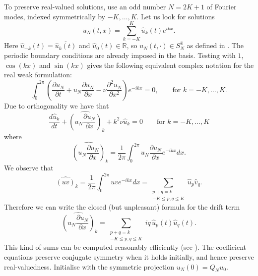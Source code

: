 To preserve real-valued solutions, use an odd number $N=2K+1$ of Fourier modes, indexed symmetrically by $-K,\dots,K$. Let us look for solutions
\begin{equation}
    \label{eq:Fourier discrete solution}
    u_N(t,x) = \sum_{k=-K}^{K} \hat u_k(t) e^{ikx}.
\end{equation}
Here $\hat u_{-k}(t)=\overline{\hat u_k(t)}$ and $\hat u_0(t)\in\mathbb R$, so $u_N(t,\cdot)\in S_N^{\mathbb R}$ as defined in . The periodic boundary conditions are already imposed in the basis. Testing with $1$, $\cos(kx)$ and $\sin(kx)$ gives the following equivalent complex notation for the real weak formulation:
\begin{equation*}
    \int_0^{2\pi} \left( \frac{\partial u_N}{\partial t} + u_N \frac{\partial u_N}{\partial x} - \nu \frac{\partial^2 u_N}{\partial x^2} \right) e^{-ikx} = 0,
    \qquad \text{for }k = -K,\dots,K.
\end{equation*}
Due to orthogonality we have that
\begin{equation*}
    \frac{d \hat u_k}{dt} + \widehat {\left( u_N \frac{\partial u_N}{\partial x} \right)}_k+ k^2 \nu \hat u_k = 0
    \qquad \text{for }k = -K,\dots,K
\end{equation*}
where
\begin{equation*}
    \widehat {\left( u_N \frac{\partial u_N}{\partial x} \right)}_k = \frac 1 {2\pi} \int_0^{2\pi} u_N \frac{\partial u_N}{\partial x} e^{-ikx} dx.
\end{equation*}
We observe that
\begin{equation*}
    \widehat {\left( uv \right)}_k = \frac 1 {2\pi} \int_0^{2\pi} uv e^{-ikx} dx = \sum_{\substack{p+q = k \\ -K\le p,q\le K}} \hat u_p \hat v_q.
\end{equation*}
Therefore we can write the closed (but unpleasant) formula for the drift term
\begin{equation*}
    \widehat {\left( u_N \frac{\partial u_N}{\partial x} \right)}_k = \sum_{\substack{p+q = k \\ -K\le p,q\le K}} i q \, \hat u_p(t) \hat u_q(t).
\end{equation*}
This kind of sums can be computed reasonably efficiently (see \cite[Section 3.4]{CanutoHussainiQuarteroniZang2011}).
The coefficient equations preserve conjugate symmetry when it holds initially, and hence preserve real-valuedness. Initialise with the symmetric projection $u_N(0)=Q_Nu_0$.

